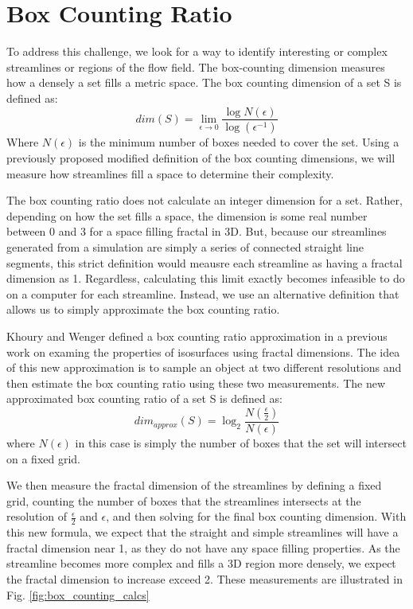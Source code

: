 \documentclass[journal]{vgtc}                %
\begin{document}
\section{Box Counting Ratio} \label{sec:bcr}

To address this challenge, we look for a way to identify interesting or complex streamlines or regions of the flow field.
The box-counting dimension measures how a densely a set fills a metric space.
The box counting dimension of a set S is defined as:
\begin{equation} dim(S) = \lim_{\epsilon \to 0}  \frac{\log N(\epsilon)}{\log(\epsilon^{-1})}\end{equation}
Where $N(\epsilon)$ is the minimum number of boxes needed to cover the set.
Using a previously proposed modified definition of the box counting dimensions, we will measure how streamlines fill a space to determine their complexity.

The box counting ratio does not calculate an integer dimension for a set.
Rather, depending on how the set fills a space, the dimension is some real number between 0 and 3 for a space filling fractal in 3D.
But, because our streamlines generated from a simulation are simply a series of connected straight line segments, this strict definition would meausre each streamline as having a fractal dimension as 1.
Regardless, calculating this limit exactly becomes infeasible to do on a computer for each streamline.
Instead, we use an alternative definition that allows us to simply approximate the box counting ratio.

Khoury and Wenger \cite{khoury} defined a box counting ratio approximation in a previous work on examing the properties of isosurfaces using fractal dimensions.
The idea of this new approximation is to sample an object at two different resolutions and then estimate the box counting ratio using these two measurements.
The new approximated box counting ratio of a set S is defined as:
\begin{equation} dim_{approx}(S) = \log_2\frac{N(\frac{\epsilon}{2})}{N(\epsilon)}\end{equation}
where $N(\epsilon)$ in this case is simply the number of boxes that the set will intersect on a fixed grid.

We then measure the fractal dimension of the streamlines by defining a fixed grid, counting the number of boxes that the streamlines intersects at the resolution of $\frac{\epsilon}{2}$ and ${\epsilon}$, and then solving for the final box counting dimension.
With this new formula, we expect that the straight and simple streamlines will have a fractal dimension near 1, as they do not have any space filling properties.
As the streamline becomes more complex and fills a 3D region more densely, we expect the fractal dimension to increase exceed 2.
These measurements are illustrated in Fig. \ref{fig:box_counting_calcs}
\end{document}

